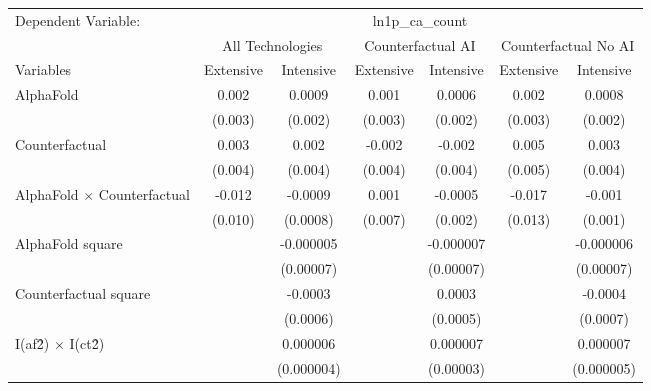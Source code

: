 \begingroup
\centering
\begin{tabular}{lcccccc}
   \tabularnewline \midrule \midrule
   Dependent Variable: & \multicolumn{6}{c}{ln1p\_ca\_count}\\
 & \multicolumn{2}{c}{All Technologies} & \multicolumn{2}{c}{Counterfactual AI} & \multicolumn{2}{c}{Counterfactual No AI} \\
\cmidrule(lr){1-1}\cmidrule(lr){2-3} \cmidrule(lr){4-5} \cmidrule(lr){6-7}
Variables & \multicolumn{1}{c}{Extensive} & \multicolumn{1}{c}{Intensive} & \multicolumn{1}{c}{Extensive} & \multicolumn{1}{c}{Intensive} & \multicolumn{1}{c}{Extensive} & \multicolumn{1}{c}{Intensive} \\
\cmidrule(lr){1-1}\cmidrule(lr){2-2} \cmidrule(lr){3-3} \cmidrule(lr){4-4} \cmidrule(lr){5-5} \cmidrule(lr){6-6} \cmidrule(lr){7-7}
   AlphaFold                          & 0.002   & 0.0009     & 0.001   & 0.0006    & 0.002   & 0.0008\\   
                                      & (0.003) & (0.002)    & (0.003) & (0.002)   & (0.003) & (0.002)\\   
   Counterfactual                     & 0.003   & 0.002      & -0.002  & -0.002    & 0.005   & 0.003\\   
                                      & (0.004) & (0.004)    & (0.004) & (0.004)   & (0.005) & (0.004)\\   
   AlphaFold $\times$ Counterfactual  & -0.012  & -0.0009    & 0.001   & -0.0005   & -0.017  & -0.001\\   
                                      & (0.010) & (0.0008)   & (0.007) & (0.002)   & (0.013) & (0.001)\\   
   AlphaFold square                   &         & -0.000005  &         & -0.000007 &         & -0.000006\\   
                                      &         & (0.00007)  &         & (0.00007) &         & (0.00007)\\   
   Counterfactual square              &         & -0.0003    &         & 0.0003    &         & -0.0004\\   
                                      &         & (0.0006)   &         & (0.0005)  &         & (0.0007)\\   
   I(af\^2) $\times$ I(ct\^2)         &         & 0.000006   &         & 0.000007  &         & 0.000007\\   
                                      &         & (0.000004) &         & (0.00003) &         & (0.000005)\\   

\end{tabular}
